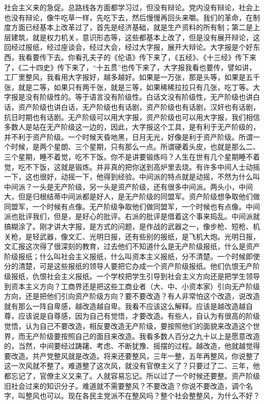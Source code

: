 社会主义来的急促。总路线各方面都学习过，但没有辩论。党内没有辩论，社会上也没有辩论，像牛吃草一样，先吃下去，然后慢慢再回头来嚼。我们的革命，在制度方面已经基本上改革过了，首先是经济基础，就是生产资料的所有制；第二是上层建筑，就是权力机关，意识形态等，这些都基本上改了，但是没有展开辩论，这回经过报纸，经过座谈会，经过大会，经过大字报，展开大辩论。大字报是个好东西，我看要传下去。你看孔夫子的《伦语》传下来了，《五经》、《十三经》传下来了，《二十四史》传下来了，“十五贯”也传下来了，大字报我看也要传，譬如讲，工厂里整风，我看用大字报好，越多越好。如果是一万张，那是头等，如果是五千张，就是二等，如果只有两千张，就是三等，如果稀稀拉拉只有几张，吃丁等。大字报是没有阶级性的。等于语言没有阶级性。白话文没有阶级性，无产阶级也讲白话，资产阶级也讲白话，无产阶级也有话剧，资产阶级也有话剧，汉奸也有话剧，抗日时期也有话剧。无产阶级可以用大字报，资产阶级也可以用大字报，我们相信多数人是站在无产阶级这一边的，因此，大字报这个工具，是有利于无产阶级的，并不利于资产阶级。一个时候天昏地黑，日月无光，好像是利于资产阶级。所谓一个时候，是两个星朗、三个星期，只有那么一点。所谓硬着头皮，也就是那么二、三个星期，睡不着觉，吃不下饭。你不是讲要锻炼吗？人生在世有几个星期睡不着觉，吃不下饭，这就是锻炼。并非真的把你送到高炉里去烧。有许多中间人士动摇一下，这也很好，动摇一下，他得到经验。中间派的特点就是动摇，不然为什么叫中间派？一头是无产阶级，另一头是资产阶级，还有很多中间派。两头小，中间大，但是归根结蒂中间派都是好人，是无产阶级的同盟军。资产阶级想争取他们做同盟军，一个时候有点像。无产阶级争取他们做同盟军，一个时候也有点像。中间派也批评我们，但是，是好心的批评。右派的批评是借着这个事来捣乱。中间派就搞糊涂了。刚才讲大字报，是方式的问题，是作战的武器之一，像步枪、短枪、机关枪，是轻武器，像文汇、光明日报，还有些别的报纸，是飞机大炮。光明日报，文汇报这次得了很深刻的教育，过去他们不知道什么是无产阶级报纸，什么是资产阶级报纸；什么叫社会主义报纸，什么叫资本主义报纸，分不清楚。一个时候即使分的清楚，可是这些报纸的领导人要把它办成一个资产阶级报纸。他们仇恨无产阶级报纸，仇恨社会主义报纸。一个学校把学生引导到社会主义方向还是把学生领导到资本主义方向？工商界还是把这些工商业者（大、中、小资本家）引向无产阶级方向，还是把他们引向资产阶级方向？要不要改造？有人非常怕这个改造，说改造就有那么一阵自卑感，越改造越自卑。我看不应该这么解释。应该是越改造越自尊，应该说是自尊感，因为自己有觉悟，才要改造。有些人，自认为有很高的阶级觉悟，认为自己不要改造，相反要改造无产阶级，要按照他们的面貌来改造这个世界，而无产阶级要按照自己的面目来改造。我看多数人百分之九十以上是愿意改造的，当然，中间要经过踌躇、考虑、不断犹豫、摇摆的过程。越改造，他就越觉得要改造。共产党整风就是改造。将来还要整风，三年一整，五年再整风，你说整了这一次风就不整了。难道整了这次风，就没有官僚主义了？只要过了二、三年，他都忘记了，官僚主义又来了。人就容易忘记。所以过了一个时候还要整。资产阶级旧社会过来的知识分子。难道就不需要整风？不要改造？你说不要改造，调个名字，叫整风也可以。现在各民主党派不在整风吗？整个社会整整风，为什么不好？

